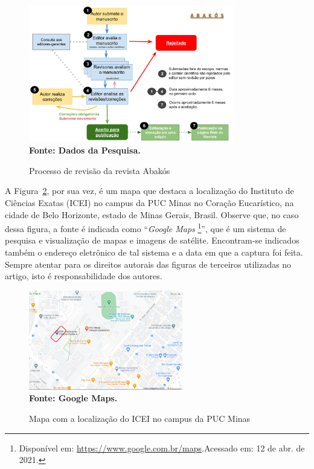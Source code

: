 \documentclass[a4paper,12pt]{article}
\begin{document}
\begin{figure}[htb]
	\centering	
	\caption[Processo de Revisão da Revista Abakós.]{Processo de revisão da revista Abakós}
	\label{fig:figura1}
	\includegraphics[width=0.8\textwidth]{figuras/Abakos-review.png}\\
	\textbf{\footnotesize Fonte: Dados da Pesquisa.}
\end{figure}

A Figura~\ref{fig:figura2}, por sua vez, é um mapa que destaca a localização do Instituto de Ciências Exatas (ICEI) no campus da PUC Minas no Coração Eucarístico, na cidade de Belo Horizonte, estado de Minas Gerais, Brasil. Observe que, no caso dessa figura, a fonte é indicada como “{\it Google Maps}	\footnote{Disponível em: \url{https://www.google.com.br/maps}.Acessado em: 12 de abr. de 2021.}”, que é um sistema de pesquisa e visualização de mapas e imagens de satélite. Encontram-se indicados também o endereço eletrônico de tal sistema e a data em que a captura foi feita. Sempre atentar para os direitos autorais das figuras de terceiros utilizadas no artigo, isto é responsabilidade dos autores.

\begin{figure}[ht]
	\centering	
	\caption[Mapa com a localização do ICEI.]{Mapa com a localização do ICEI no campus da PUC Minas}
	\label{fig:figura2}
	\includegraphics[width=0.6\textwidth]{figuras/Mapa-ICEI-PUCMinas.png}\\
	\textbf{\footnotesize Fonte: Google Maps.}
\end{figure}
\end{document}
